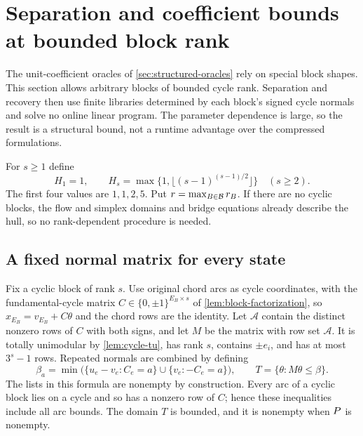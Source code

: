 \section{Separation and coefficient bounds at bounded block rank}\label{sec:bounded-rank}
The unit-coefficient oracles of \cref{sec:structured-oracles} rely on
special block shapes. This section allows arbitrary blocks of bounded cycle
rank. Separation and recovery then use finite libraries determined by each
block's signed cycle normals and solve no online linear program. The
parameter dependence is large, so the result is a structural bound, not a
runtime advantage over the compressed formulations.

For $s\ge1$ define
\begin{equation}\label{eq:rank-coefficient-bound}
 H_1=1,\qquad
 H_s=\max\{1,\lfloor(s-1)^{(s-1)/2}\rfloor\}\quad(s\ge2).
\end{equation}
The first four values are $1,1,2,5$. Put $r=\max_{B\in\mathcal B}r_B$.
If there are no cyclic blocks, the flow and simplex domains and bridge
equations already describe the hull, so no rank-dependent procedure is needed.

\subsection{A fixed normal matrix for every state}\label{subsec:rank-normal-matrix}
Fix a cyclic block of rank $s$. Use original chord arcs as cycle coordinates,
with the fundamental-cycle matrix $C\in\{0,\pm1\}^{E_B\times s}$ of
\cref{lem:block-factorization}, so
$x_{E_B}=v_{E_B}+C\theta$ and the chord rows are the identity.
Let $\mathcal A$ contain the distinct nonzero rows of $C$ with both signs,
and let $M$ be the matrix with row set $\mathcal A$. It is totally
unimodular by \cref{lem:cycle-tu}, has rank $s$, contains $\pm e_i$,
and has at most $3^s-1$ rows. Repeated normals are combined by defining
\begin{equation}\label{eq:rank-base-rhs}
 \beta_a=\min\bigl(\{u_e-v_e:C_e=a\}\cup
                    \{v_e:-C_e=a\}\bigr),\qquad
 T=\{\theta:M\theta\le\beta\}.
\end{equation}
The lists in this formula are nonempty by construction. Every arc of a
cyclic block lies on a cycle and so has a nonzero row of $C$; hence these
inequalities include all arc bounds. The domain $T$ is bounded, and it is
nonempty when $P$ is nonempty.

